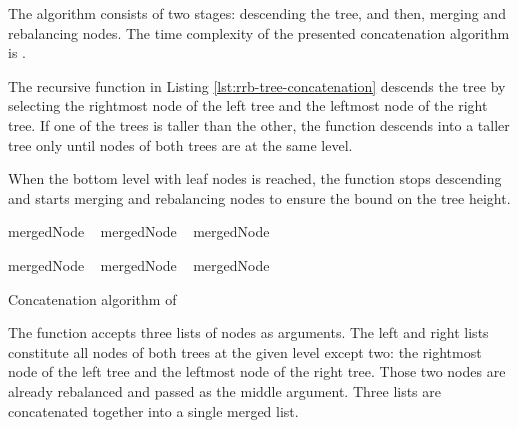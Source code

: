 The algorithm consists of two stages: descending the tree, and then, merging and rebalancing nodes. The time complexity of the presented concatenation algorithm is .

The recursive function in Listing \ref{lst:rrb-tree-concatenation} descends the tree by selecting the rightmost node of the left tree and the leftmost node of the right tree. If one of the trees is taller than the other, the function descends into a taller tree only until nodes of both trees are at the same level.

When the bottom level with leaf nodes is reached, the function stops descending and starts merging and rebalancing nodes to ensure the  bound on the tree height.

\begin{listing}[!ht]
    \begin{algorithmic}[1]
                \State mergedNode \la\ 
                \State \Return {}
                \State mergedNode \la\ 
                \State \Return {}
            \Else
                \State mergedNode \la\ \nil{}

                    \State mergedNode \la\ 
                \Else
                        \State mergedNode \la\ 
                    \Else
                        \State mergedNode \la\ 
                    \EndIf
                \EndIf

                \State \Return {}
            \EndIf
        \EndFunction
    \end{algorithmic}

    \caption{Concatenation algorithm of \treerrb{}}
    \label{lst:rrb-tree-concatenation}
\end{listing}

The  function accepts three lists of nodes as arguments. The left and right lists constitute all nodes of both trees at the given level except two: the rightmost node of the left tree and the leftmost node of the right tree. Those two nodes are already rebalanced and passed as the middle argument. Three lists are concatenated together into a single merged list.

